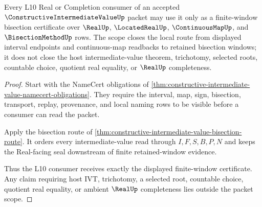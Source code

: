 \begin{theorem}
\label{thm:constructive-intermediate-value-l10-scope}
Every L10 Real or Completion consumer of an accepted $\ConstructiveIntermediateValueUp$ packet may use it only as a finite-window bisection certificate over $\RealUp$, $\LocatedRealUp$, $\ContinuousMapUp$, and $\BisectionMethodUp$ rows. The scope closes the local route from displayed interval endpoints and continuous-map readbacks to retained bisection windows; it does not close the host intermediate-value theorem, trichotomy, selected roots, countable choice, quotient real equality, or $\RealUp$ completeness.
\end{theorem}
\begin{proof}
Start with the NameCert obligations of \autoref{thm:constructive-intermediate-value-namecert-obligations}. They require the interval, map, sign, bisection, transport, replay, provenance, and local naming rows to be visible before a consumer can read the packet.

Apply the bisection route of \autoref{thm:constructive-intermediate-value-bisection-route}. It orders every intermediate-value read through $I,F,S,B,P,N$ and keeps the Real-facing seal downstream of finite retained-window evidence.

Thus the L10 consumer receives exactly the displayed finite-window certificate. Any claim requiring host IVT, trichotomy, a selected root, countable choice, quotient real equality, or ambient $\RealUp$ completeness lies outside the packet scope.
\end{proof}


\begin{closurestatus}{\ConstructiveIntermediateValueUp}
  \theoryclosure{\seedClosure}
  \formalstatus{\unformalizedV}
\end{closurestatus}
